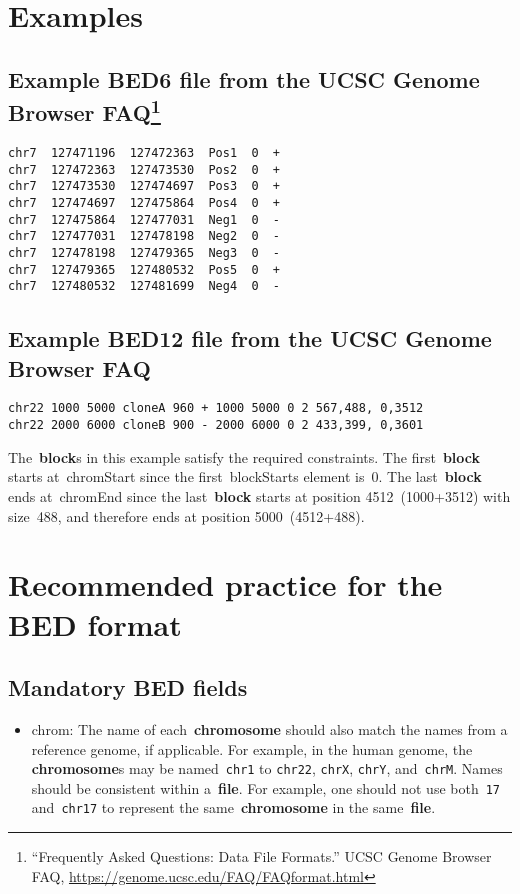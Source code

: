 \documentclass[11pt]{article}
\begin{document}
\section{Examples}

\subsection[title]{Example BED6 file from the \acs{UCSC} Genome Browser FAQ\footnote{``Frequently
    Asked Questions: Data File Formats.'' \ac{UCSC} Genome Browser FAQ,
    \url{https://genome.ucsc.edu/FAQ/FAQformat.html}}}\label{sec:example-bed6}

\begin{verbatim}
chr7  127471196  127472363  Pos1  0  +
chr7  127472363  127473530  Pos2  0  +
chr7  127473530  127474697  Pos3  0  +
chr7  127474697  127475864  Pos4  0  +
chr7  127475864  127477031  Neg1  0  -
chr7  127477031  127478198  Neg2  0  -
chr7  127478198  127479365  Neg3  0  -
chr7  127479365  127480532  Pos5  0  +
chr7  127480532  127481699  Neg4  0  -
\end{verbatim}

\subsection{Example BED12 file from the \acs{UCSC} Genome Browser FAQ}
\begin{verbatim}
chr22 1000 5000 cloneA 960 + 1000 5000 0 2 567,488, 0,3512
chr22 2000 6000 cloneB 900 - 2000 6000 0 2 433,399, 0,3601
\end{verbatim}

The~\textbf{block}s in this example satisfy the required constraints.
The first~\textbf{block} starts at~\textsf{chromStart} since the first~\textsf{blockStarts} element is~0.
The last~\textbf{block} ends at~\textsf{chromEnd} since the last~\textbf{block} starts at position 4512~(1000+3512) with size~488, and therefore ends at position 5000~(4512+488).

\section{Recommended practice for the \acs{BED} format}

\subsection{Mandatory \acs{BED} fields}
\begin{itemize}
\item \textsf{chrom}: The name of each~\textbf{chromosome} should also match the names from a reference genome, if applicable.
  For example, in the human genome, the \textbf{chromosome}s may be named~\texttt{chr1} to \texttt{chr22}, \texttt{chrX}, \texttt{chrY}, and~\texttt{chrM}.
  Names should be consistent within a~\textbf{file}.
  For example, one should not use both~\texttt{17} and~\texttt{chr17} to represent the same~\textbf{chromosome} in the same~\textbf{file}.
\end{itemize}
\end{document}
